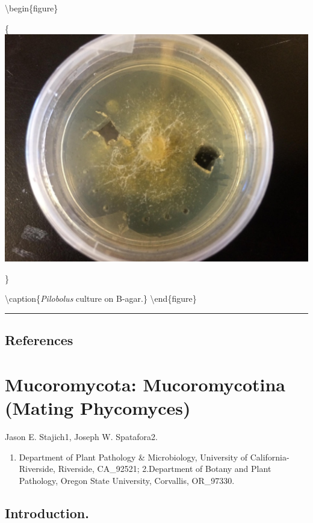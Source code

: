 \documentclass[]{book}
\providecommand{\tightlist}{%
  \setlength{\itemsep}{0pt}\setlength{\parskip}{0pt}}
\begin{document}
\textbackslash begin\{figure\}

\{\centering \includegraphics{img/Ch9_Fig5}

\}

\textbackslash caption\{\emph{Pilobolus} culture on B-agar.\}\label{fig:ch9fig5}
\textbackslash end\{figure\}

\begin{center}\rule{0.5\linewidth}{\linethickness}\end{center}

\hypertarget{references-7}{%
\section{References}\label{references-7}}

\hypertarget{Mucoromycotina}{%
\chapter{Mucoromycota: Mucoromycotina (Mating Phycomyces)}\label{Mucoromycotina}}

Jason E. Stajich1, Joseph W. Spatafora2.

\begin{enumerate}
\def\labelenumi{\arabic{enumi}.}
\tightlist
\item
  Department of Plant Pathology \& Microbiology, University of California-Riverside, Riverside, CA\_92521; 2.Department of Botany and Plant Pathology, Oregon State University, Corvallis, OR\_97330.
\end{enumerate}

\hypertarget{introduction.}{%
\section{Introduction.}\label{introduction.}}
\end{document}
